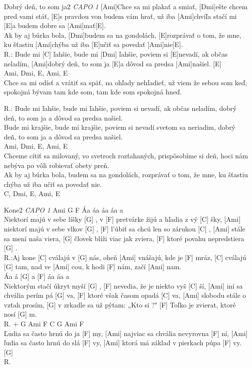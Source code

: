 \documentclass[12pt]{article}
\begin{document}
\begin{song}{Dobrý deň, to som ja}{2}
	\textit{CAPO 1}
	[Ami]Chce sa mi plakať a smiať,
	[Dmi]ešte chcem pred vami stáť,
	[E]s pravdou von budem vám hrať,
	už iba [Ami]chvíľa stačí mi [E]a budem dobre sa [Ami]mať[E].
	\\
	[Ami]Ak by aj búrka bola,
	[Dmi]budem sa na gondolách,
	[E]rozprávať o tom, že mne,
	ku šťastiu [Ami]chýba už iba [E]učiť sa povedať [Ami]nie[E].
	\\
	R.:
	Bude mi [C] ľahšie, bude mi [Dmi] ľahšie,
	poviem si [E]nevadí, ak občas neladím,
	[Ami]dobrý deň, to som ja 
	[E]a dôvod sa predsa [Ami]našiel. [E]
	\\
	Ami, Dmi, E, Ami, E
	\\
	Chce sa mi odísť a vrátiť sa späť,
	na ohľady nehľadieť,
	už viem že sebou som keď,
	spokojná bývam tam kde som,
	tam kde som spokojná hneď.
	\columnbreak
	
	R.:
	Bude mi ľahšie, bude mi ľahšie,
	poviem si nevadí, ak občas neladím,
	dobrý deň, to som ja 
	a dôvod sa predsa našiel.
	\\
	Bude mi krajšie, bude mi krajšie,
	poviem si nevadí svetom sa neriadim,
	dobrý deň, to som ja 
	a dôvod sa predsa našiel.
	\\
	Ami, Dmi, E, Ami, E
	\\
	Chceme cítiť sa milovaný,
	vo svetroch rozťahaných,
	prispôsobíme si deň,
	hoci nám nebýva po vôli robievať obety preň.
	\\
	Ak by aj búrka bola,
	budem sa na gondolách,
	rozprávať o tom, že mne,
	ku šťastiu chýba už iba učiť sa povedať nie.
	\\
	C, Dmi, E, Ami, E
\end{song}

\begin{song}{Kone}{2}
	\textit{CAPO 1}
	Ami G F	
	Áa áa áa áa a	
	\\
	[Ami] Niektorí majú v sebe líšky [G] ,
	v [F] pretvárke žijú a hľadia z vý [C] šky,
	[Ami] niektorí majú v sebe vlkov [G] ,
	[F] l'úbiť sa chcú len so zárukou [C] ,
	[Ami] stále sa mení naša viera,
	[G] človek blíži viac jak zviera,
	[F] ktoré povahu nepredstiera [G] .
	\\
	R.:Aj kone [C] cválajú v [G] nás,
	oheň [Ami] vnášajú, kde je [F] mráz,
	[C] cválajú [G] tam, nad ve [Ami] cou,
	k hodi [F] nám, začí [Ami] nam.
	\\
	Áa á [G] a [F] áa áa a
	\\
	[Ami] Niektorým stačí úkryt myší [G] ,
	[F] nevedia, že je niekto vyš [C] ší,
	[Ami] iní sa chvália perím pá [G] va,
	[F] ktoré však časom opadá [C] va,
	[Ami] slobodu stále o vzťah prosím,
	[G] v zrkadle sa už pýtam: „Kto si ?"
	[F] Toľko je zvierat, ktoré nosí [G] m.
	\\
	R. + G Ami F C G Ami F
	\\
	[Ami] Ľudia sa často hrnú do ja [F] my,
	[Ami] najviac sa chvália nevyrovna [F] ní,
	[Ami] ľudia sa často hrnú do slá [F] vy,
	[Ami] ktorá má základ v pierkach púpa [F] vy. [G]
	\\
	R.
\end{song}
\end{document}
